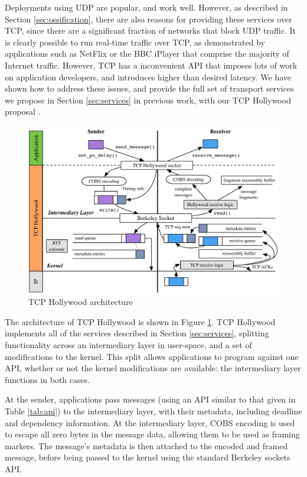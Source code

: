 \documentclass[10pt]{sig-alternate-05-2015}
\begin{document}
Deployments using UDP are popular, and work well. However, as described in
Section \ref{sec:ossification}, there are also reasons for providing these
services over TCP, since there are a significant fraction of networks that
block UDP traffic. It is clearly possible to run real-time traffic over
TCP, as demonstrated by applications such as NetFlix or the BBC iPlayer
that comprise the majority of Internet traffic. However, TCP has a
inconvenient API that imposes lots of work on application developers, and
introduces higher than desired latency. We have shown how to address these
issues, and provide the full set of transport services we propose in
Section \ref{sec:services} in previous work, with our TCP Hollywood
proposal \cite{mcquistin2016hollywood}.

\begin{figure}[t]
 \centering
 \includegraphics[scale=0.45]{figures/tcp-hollywood.pdf}
  \caption{TCP Hollywood architecture}
\label{diagram:tcp-hollywood}
\end{figure}

The architecture of TCP Hollywood is shown in Figure
\ref{diagram:tcp-hollywood}. TCP Hollywood implements all of the services
described in Section \ref{sec:services}, splitting functionality across
an intermediary layer in user-space, and a set of modifications to the
kernel. This split allows applications to program against one API, whether
or not the kernel modifications are available: the intermediary layer
functions in both cases.

At the sender, applications pass messages (using an API similar to that
given in Table \ref{tab:api}) to the intermediary layer, with their
metadata, including deadline and dependency information. At the 
intermediary layer, COBS encoding \cite{CB97COBS} is used to escape all
zero bytes in the message data, allowing them to be used as framing
markers. The message's metadata is then attached to the encoded and framed
message, before being passed to the kernel using the standard Berkeley
sockets API.
\end{document}
